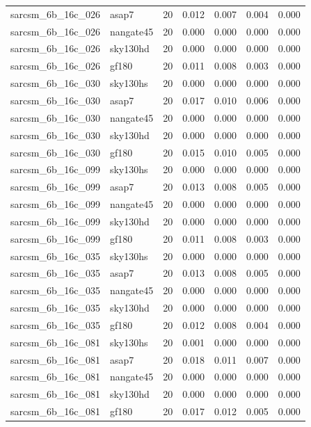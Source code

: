 \begin{tabular}{llrrrrr}
sarcsm\_6b\_16c\_026 & asap7 & 20 & 0.012 & 0.007 & 0.004 & 0.000 \\
sarcsm\_6b\_16c\_026 & nangate45 & 20 & 0.000 & 0.000 & 0.000 & 0.000 \\
sarcsm\_6b\_16c\_026 & sky130hd & 20 & 0.000 & 0.000 & 0.000 & 0.000 \\
sarcsm\_6b\_16c\_026 & gf180 & 20 & 0.011 & 0.008 & 0.003 & 0.000 \\
sarcsm\_6b\_16c\_030 & sky130hs & 20 & 0.000 & 0.000 & 0.000 & 0.000 \\
sarcsm\_6b\_16c\_030 & asap7 & 20 & 0.017 & 0.010 & 0.006 & 0.000 \\
sarcsm\_6b\_16c\_030 & nangate45 & 20 & 0.000 & 0.000 & 0.000 & 0.000 \\
sarcsm\_6b\_16c\_030 & sky130hd & 20 & 0.000 & 0.000 & 0.000 & 0.000 \\
sarcsm\_6b\_16c\_030 & gf180 & 20 & 0.015 & 0.010 & 0.005 & 0.000 \\
sarcsm\_6b\_16c\_099 & sky130hs & 20 & 0.000 & 0.000 & 0.000 & 0.000 \\
sarcsm\_6b\_16c\_099 & asap7 & 20 & 0.013 & 0.008 & 0.005 & 0.000 \\
sarcsm\_6b\_16c\_099 & nangate45 & 20 & 0.000 & 0.000 & 0.000 & 0.000 \\
sarcsm\_6b\_16c\_099 & sky130hd & 20 & 0.000 & 0.000 & 0.000 & 0.000 \\
sarcsm\_6b\_16c\_099 & gf180 & 20 & 0.011 & 0.008 & 0.003 & 0.000 \\
sarcsm\_6b\_16c\_035 & sky130hs & 20 & 0.000 & 0.000 & 0.000 & 0.000 \\
sarcsm\_6b\_16c\_035 & asap7 & 20 & 0.013 & 0.008 & 0.005 & 0.000 \\
sarcsm\_6b\_16c\_035 & nangate45 & 20 & 0.000 & 0.000 & 0.000 & 0.000 \\
sarcsm\_6b\_16c\_035 & sky130hd & 20 & 0.000 & 0.000 & 0.000 & 0.000 \\
sarcsm\_6b\_16c\_035 & gf180 & 20 & 0.012 & 0.008 & 0.004 & 0.000 \\
sarcsm\_6b\_16c\_081 & sky130hs & 20 & 0.001 & 0.000 & 0.000 & 0.000 \\
sarcsm\_6b\_16c\_081 & asap7 & 20 & 0.018 & 0.011 & 0.007 & 0.000 \\
sarcsm\_6b\_16c\_081 & nangate45 & 20 & 0.000 & 0.000 & 0.000 & 0.000 \\
sarcsm\_6b\_16c\_081 & sky130hd & 20 & 0.000 & 0.000 & 0.000 & 0.000 \\
sarcsm\_6b\_16c\_081 & gf180 & 20 & 0.017 & 0.012 & 0.005 & 0.000 \\

\end{tabular}
